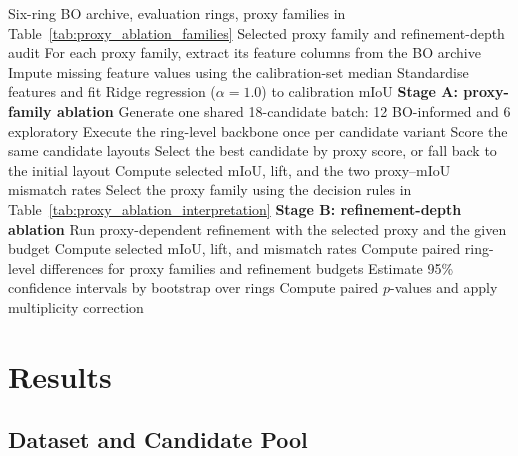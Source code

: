 \documentclass[a4paper,fleqn]{cas-dc}
\begin{document}
{\begin{algorithm}[t]
\caption{Two-stage proxy and refinement-depth ablation}
\label{alg:proxy_ablation_shared_candidates}
\begin{algorithmic}[1]
\Require Six-ring BO archive, evaluation rings, proxy families in Table~\ref{tab:proxy_ablation_families}
\Ensure Selected proxy family and refinement-depth audit
\State For each proxy family, extract its feature columns from the BO archive
\State Impute missing feature values using the calibration-set median
\State Standardise features and fit Ridge regression ($\alpha=1.0$) to calibration mIoU
\Statex \textbf{Stage A: proxy-family ablation}
    \State Generate one shared 18-candidate batch: 12 BO-informed and 6 exploratory
    \State Execute the ring-level backbone once per candidate variant
        \State Score the same candidate layouts
        \State Select the best candidate by proxy score, or fall back to the initial layout
        \State Compute selected mIoU, lift, and the two proxy--mIoU mismatch rates
    \EndFor
\EndFor
\State Select the proxy family using the decision rules in Table~\ref{tab:proxy_ablation_interpretation}
\Statex \textbf{Stage B: refinement-depth ablation}
        \State Run proxy-dependent refinement with the selected proxy and the given budget
        \State Compute selected mIoU, lift, and mismatch rates
    \EndFor
\EndFor
\State Compute paired ring-level differences for proxy families and refinement budgets
\State Estimate 95\% confidence intervals by bootstrap over rings
\State Compute paired $p$-values and apply multiplicity correction
\end{algorithmic}
\end{algorithm}

\FloatBarrier %
\clearpage
\section{Results}\label{sec:results}%
\subsection{Dataset and Candidate Pool}

}
\end{document}
